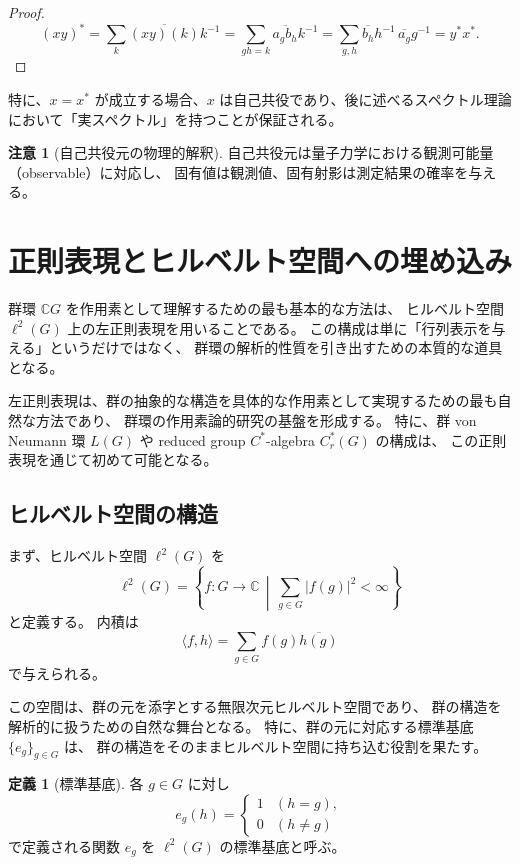 \documentclass[12pt,a4paper]{ltjarticle}
\theoremstyle{definition}
\newtheorem*{definition}{定義}
\newtheorem*{remark}{注意}
\begin{document}
\begin{proof}
\[
(xy)^*=\sum_k \overline{(xy)(k)}k^{-1}
=\sum_{gh=k}\overline{a_g b_h}k^{-1}
=\sum_{g,h}\overline{b_h}h^{-1}\,\overline{a_g}g^{-1}
=y^*x^*.
\]
\end{proof}

特に、$x = x^*$ が成立する場合、$x$ は自己共役であり、後に述べるスペクトル理論において「実スペクトル」を持つことが保証される。

\begin{remark}[自己共役元の物理的解釈]
自己共役元は量子力学における観測可能量（observable）に対応し、  
固有値は観測値、固有射影は測定結果の確率を与える。
\end{remark}

\section{正則表現とヒルベルト空間への埋め込み}

群環 $\mathbb{C}G$ を作用素として理解するための最も基本的な方法は、
ヒルベルト空間 $\ell^2(G)$ 上の左正則表現を用いることである。
この構成は単に「行列表示を与える」というだけではなく、
群環の解析的性質を引き出すための本質的な道具となる。

左正則表現は、群の抽象的な構造を具体的な作用素として実現するための最も自然な方法であり、
群環の作用素論的研究の基盤を形成する。
特に、群 von Neumann 環 $L(G)$ や reduced group $C^*$-algebra $C_r^*(G)$ の構成は、
この正則表現を通じて初めて可能となる。

\subsection{ヒルベルト空間の構造}

まず、ヒルベルト空間 $\ell^2(G)$ を
\[
\ell^2(G) = \left\{ f : G \to \mathbb{C} \,\middle|\,
\sum_{g \in G} |f(g)|^2 < \infty \right\}
\]
と定義する。
内積は
\[
\langle f, h \rangle = \sum_{g \in G} f(g)\overline{h(g)}
\]
で与えられる。

この空間は、群の元を添字とする無限次元ヒルベルト空間であり、
群の構造を解析的に扱うための自然な舞台となる。
特に、群の元に対応する標準基底 $\{e_g\}_{g\in G}$ は、
群の構造をそのままヒルベルト空間に持ち込む役割を果たす。

\begin{definition}[標準基底]
各 $g\in G$ に対し
\[
e_g(h)=
\begin{cases}
1 & (h=g),\\
0 & (h\neq g)
\end{cases}
\]
で定義される関数 $e_g$ を $\ell^2(G)$ の標準基底と呼ぶ。
\end{definition}
\end{document}
